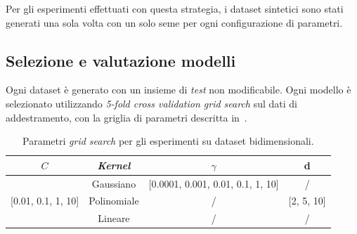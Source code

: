 Per gli esperimenti effettuati con questa strategia, i dataset sintetici sono stati generati una sola volta con un solo seme per ogni configurazione di parametri.

\subsection{Selezione e valutazione modelli}
Ogni dataset è generato con un insieme di \emph{test} non modificabile.
Ogni modello è selezionato utilizzando \emph{5-fold cross validation grid search} sul dati di addestramento, con la griglia di parametri descritta in~.
\begin{table}
    \centering
    \begin{tabular}{cccc}
        \toprule
        $C$ & \emph{Kernel} & $\gamma$ & d \\
        \midrule
        \multirow{3}{*}{[0.01, 0.1, 1, 10]} & Gaussiano   & [0.0001, 0.001, 0.01, 0.1, 1, 10]   & /\\
                                            \cline{2-4}
                                            & Polinomiale   & / & [2, 5, 10] \\
                                            \cline{2-4}
                                            & Lineare       & / & / \\
        \bottomrule
    \end{tabular}
    \caption{Parametri \emph{grid search} per gli esperimenti su dataset bidimensionali.}
    \label{tab:gridsearch_2d}
\end{table}

